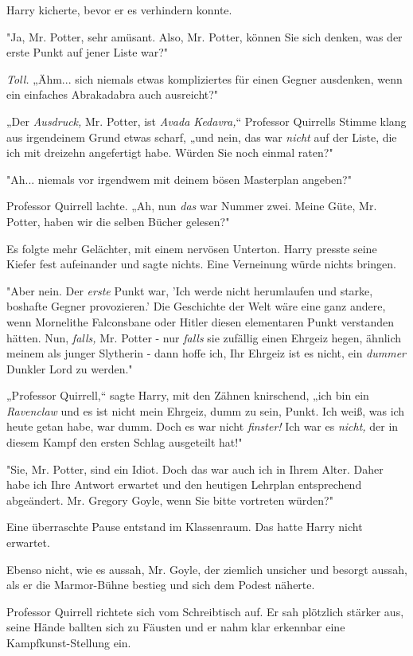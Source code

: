 {Harry kicherte, bevor er es verhindern konnte.

"Ja, Mr. Potter, sehr amüsant. Also, Mr. Potter, können Sie sich denken, was der erste Punkt auf jener Liste war?"

\emph{Toll.} „Ähm... sich niemals etwas kompliziertes für einen Gegner ausdenken, wenn ein einfaches Abrakadabra auch ausreicht?"

„Der \emph{Ausdruck,} Mr. Potter, ist \emph{Avada Kedavra,}“ Professor Quirrells Stimme klang aus irgendeinem Grund etwas scharf, „und nein, das war \emph{nicht} auf der Liste, die ich mit dreizehn angefertigt habe. Würden Sie noch einmal raten?"

"Ah... niemals vor irgendwem mit deinem bösen Masterplan angeben?"

Professor Quirrell lachte. „Ah, nun \emph{das} war Nummer zwei. Meine Güte, Mr. Potter, haben wir die selben Bücher gelesen?"

Es folgte mehr Gelächter, mit einem nervösen Unterton. Harry presste seine Kiefer fest aufeinander und sagte nichts. Eine Verneinung würde nichts bringen.

"Aber nein. Der \emph{erste} Punkt war, 'Ich werde nicht herumlaufen und starke, boshafte Gegner provozieren.' Die Geschichte der Welt wäre eine ganz andere, wenn Mornelithe Falconsbane oder Hitler diesen elementaren Punkt verstanden hätten. Nun, \emph{falls,} Mr. Potter - nur \emph{falls} sie zufällig einen Ehrgeiz hegen, ähnlich meinem als junger Slytherin - dann hoffe ich, Ihr Ehrgeiz ist es nicht, ein \emph{dummer} Dunkler Lord zu werden."

„Professor Quirrell,“ sagte Harry, mit den Zähnen knirschend, „ich bin ein \emph{Ravenclaw} und es ist nicht mein Ehrgeiz, dumm zu sein, Punkt. Ich weiß, was ich heute getan habe, war dumm. Doch es war nicht \emph{finster!} Ich war es \emph{nicht,} der in diesem Kampf den ersten Schlag ausgeteilt hat!"

"Sie, Mr. Potter, sind ein Idiot. Doch das war auch ich in Ihrem Alter. Daher habe ich Ihre Antwort erwartet und den heutigen Lehrplan entsprechend abgeändert. Mr. Gregory Goyle, wenn Sie bitte vortreten würden?"

Eine überraschte Pause entstand im Klassenraum. Das hatte Harry nicht erwartet.

Ebenso nicht, wie es aussah, Mr. Goyle, der ziemlich unsicher und besorgt aussah, als er die Marmor-Bühne bestieg und sich dem Podest näherte.

Professor Quirrell richtete sich vom Schreibtisch auf. Er sah plötzlich stärker aus, seine Hände ballten sich zu Fäusten und er nahm klar erkennbar eine Kampfkunst-Stellung ein.

}
